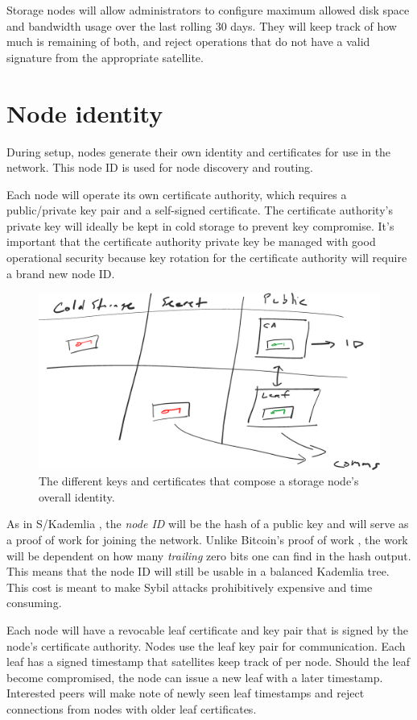 \documentclass[11pt,fleqn,openany]{book}
\begin{document}
Storage nodes will allow administrators to configure maximum allowed disk
space and bandwidth usage over the last rolling 30 days.
They will keep track of how much is remaining of both, and reject operations
that do not have a valid signature from the appropriate satellite.

\section{Node identity}\label{sec:node-id}

During setup, nodes generate their own identity and certificates for use in
the network.
This node ID is used for node discovery and routing.

Each node will operate its own certificate authority, which requires a
public/private key pair and a self-signed certificate. The certificate
authority's private key will ideally be kept in cold storage to prevent key
compromise.
It's important that the certificate authority private key be managed with good
operational security because key rotation for the certificate authority will
require a brand new node ID.

\begin{figure}
\centering
\includegraphics[width=.8\textwidth]{diagram-drafts/identity.eps}
\caption{The different keys and certificates that compose a storage node's
overall identity.}
\end{figure}

As in S/Kademlia \cite{skad}, the {\em node ID} will be the hash of a public key
and will serve as a proof of work for joining the network. Unlike Bitcoin's
proof of work \cite{bitcoin}, the work will be dependent on how many
{\em trailing}
zero bits one can find in the hash output. This means that the node ID will
still be usable in a balanced Kademlia \cite{kad} tree.
This cost is meant to make Sybil attacks prohibitively expensive and time
consuming.

Each node will have a revocable leaf certificate and key pair that is signed by
the node's certificate authority. Nodes use the leaf key pair for
communication. Each leaf has a signed timestamp that satellites
keep track of per node. Should the leaf become compromised, the node can issue
a new leaf with a later timestamp. Interested peers will make note of newly
seen leaf timestamps and reject connections from nodes with older leaf
certificates.
\end{document}

